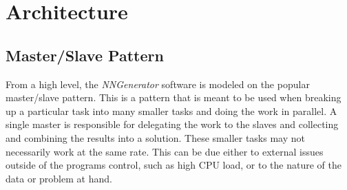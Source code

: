\chapter[Architecture]{Architecture}

\section{Master/Slave Pattern}
From a high level, the {\em NNGenerator} software is modeled on the popular master/slave pattern. 
This is a pattern that is meant to be used when breaking up a particular task into many smaller tasks and doing the work in parallel.
A single master is responsible for delegating the work to the slaves and collecting and combining the results into a solution.
These smaller tasks may not necessarily work at the same rate.
This can be due either to external issues outside of the programs control, such as high CPU load, or to the nature of the data or problem at hand.

